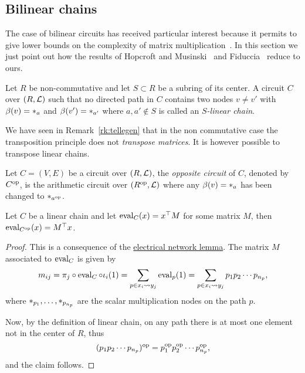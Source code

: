 \subsection{Bilinear chains}
\label{sec:bilinear-chains}

The case of bilinear circuits has received particular interest because
it permits to give lower bounds on the complexity of matrix
multiplication~\cite{fiduccia:phd}. In this section we just point out
how the results of Hopcroft and Musinski~\cite{hopcroft+musinski73}
and Fiduccia~\cite{fiduccia:phd} reduce to ours.

\begin{definition}
  Let $R$ be non-commutative and let $S\subset R$ be a subring of its
  center. A circuit $C$ over $(R,\mathcal{L})$ such that no directed path
  in $C$ contains two nodes $v\ne v'$ with $\beta(v)=*_{a}$ and
  $\beta(v')=*_{a'}$ where $a,a'\not\in S$ is called an
  \emph{$S$-linear chain}.
\end{definition}

We have seen in Remark~\ref{rk:tellegen} that in the non commutative
case the transposition principle does not \emph{transpose
  matrices}. It is however possible to transpose linear chains.

\begin{definition}
  Let $C=(V,E)$ be a circuit over $(R,\mathcal{L})$, the
  \emph{opposite circuit} of $C$,
  denoted by $C^{\mathrm{op}}$, is the arithmetic circuit over
  $(R^{\mathrm{op}},\mathcal{L})$ where any $\beta(v)=*_{a}$ has been changed
  to $*_{a^{\mathrm{op}}}$.
\end{definition}

\begin{proposition}
  Let $C$ be a linear chain and let $\operatorname{eval}_C(x)=x^\top M$ for some
  matrix $M$, then $\operatorname{eval}_{C^{\mathrm{op}}}(x)=M^\top x$.
\end{proposition}
\begin{proof}
  This is a consequence of the
  \hyperref[th:electrical-network]{electrical network lemma}.  The
  matrix $M$ associated to $\operatorname{eval}_C$ is given by
  \begin{equation}
    \label{eq:243}
    m_{ij} = \pi_j\circ\operatorname{eval}_C\circ\iota_i(1)
    = \sum_{p\in x_i\leadsto y_j}\operatorname{eval}_p(1) =
    \sum_{p\in x_i\leadsto y_j} p_1p_2\cdots p_{n_p}
    \text{,}
  \end{equation}
  where $*_{p_1},\ldots,*_{p_{n_p}}$ are the scalar
  multiplication nodes on the path $p$.

  Now, by the definition of linear chain, on any path there is at most
  one element not in the center of $R$, thus
  \begin{equation}
    \label{eq:245}
    (p_1p_2\cdots p_{n_p})^{\mathrm{op}}=p_{1}^{\mathrm{op}} p_2^{\mathrm{op}}\cdots p_{n_p}^{\mathrm{op}}
    \text{,}
  \end{equation}
  and the claim follows.
\end{proof}

